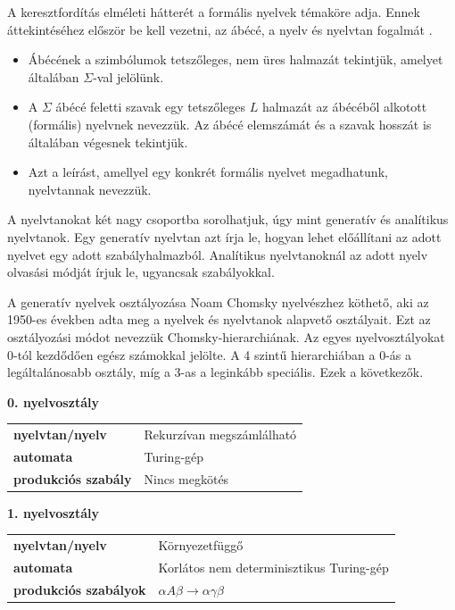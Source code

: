 

A keresztfordítás elméleti hátterét a formális nyelvek témaköre adja.
Ennek áttekintéséhez először be kell vezetni, az ábécé, a nyelv és nyelvtan fogalmát \cite{formalis}.
\begin{itemize}
\item Ábécének a szimbólumok tetszőleges, nem üres halmazát tekintjük, amelyet általában $\Sigma$-val jelölünk.
\item A $\Sigma$ ábécé feletti szavak egy tetszőleges $L$ halmazát az ábécéből alkotott (formális) nyelvnek nevezzük.
Az ábécé elemszámát és a szavak hosszát is általában végesnek tekintjük.
\item Azt a leírást, amellyel egy konkrét formális nyelvet megadhatunk, nyelvtannak nevezzük.
\end{itemize}
\cite{formalis}

A nyelvtanokat két nagy csoportba sorolhatjuk, úgy mint generatív és analítikus nyelvtanok.
Egy generatív nyelvtan azt írja le, hogyan lehet előállítani az adott nyelvet egy adott szabályhalmazból.
Analítikus nyelvtanoknál az adott nyelv olvasási módját írjuk le, ugyancsak szabályokkal.

A generatív nyelvek osztályozása Noam Chomsky nyelvészhez köthető, aki az 1950-es években adta meg a nyelvek és nyelvtanok alapvető osztályait. Ezt az osztályozási módot nevezzük Chomsky-hierarchiának. Az egyes nyelvosztályokat 0-tól kezdődően egész számokkal jelölte. A 4 szintű hierarchiában a 0-ás a legáltalánosabb osztály, míg a 3-as a leginkább speciális. Ezek a következők.

\bigskip

\noindent \textbf{0. nyelvosztály}

\medskip

\begin{tabular}{ll}
\textbf{nyelvtan/nyelv} & Rekurzívan megszámlálható \\
\textbf{automata} & Turing-gép \\
\textbf{produkciós szabály} & Nincs megkötés \\
\end{tabular}

\bigskip

\noindent \textbf{1. nyelvosztály}

\medskip

\begin{tabular}{ll}
\textbf{nyelvtan/nyelv} & Környezetfüggő \\
\textbf{automata} & Korlátos nem determinisztikus Turing-gép \\
\textbf{produkciós szabályok} & $\alpha A \beta \rightarrow \alpha \gamma \beta$ \\
\end{tabular}


